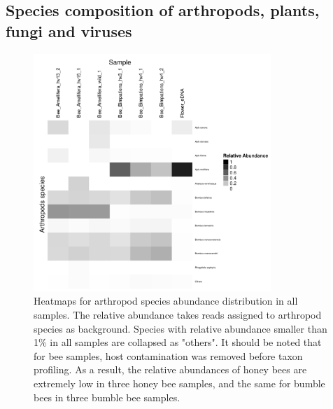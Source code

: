\documentclass[11pt]{article}
\begin{document}
  \subsection{Species composition of arthropods, plants, fungi and viruses}
  \begin{figure}[H]
    \centering
    \includegraphics[width=0.8\textwidth]{../Figures/RelativeAbundance_0_01_species_Arthropods.pdf}
    \caption{Heatmaps for arthropod species abundance distribution in all samples. 
    The relative abundance takes reads assigned to arthropod species as background. 
    Species with relative abundance smaller than 1\% in all samples are collapsed as "others". 
    It should be noted that for bee samples, host contamination was removed before taxon profiling. 
    As a result, the relative abundances of honey bees are extremely low in three honey bee samples, and the same for bumble bees in three bumble bee samples.}
    \label{ArthropodHeatmap}
    \end{figure}
\end{document}
